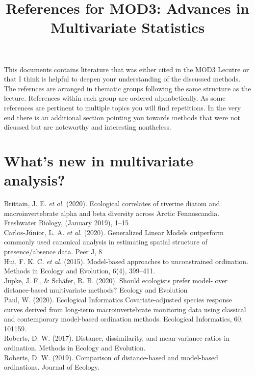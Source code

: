 \documentclass{article}
\title{References for MOD3: Advances in Multivariate Statistics}
\begin{document}
\maketitle

This documents contains literature that was either cited in the MOD3 Lecutre or that I think is helpful to deepen your understanding of the discussed methods. The refernces are arranged in thematic groups following the same structure as the lecture. References within each group are ordered alphabetically. As some references are pertinent to multiple topics you will find repetitions. In the very end there is an additional section pointing you towards methods that were not dicussed but are noteworthy and interesting nontheless.   

\section{What’s new in multivariate analysis?}

Brittain, J. E. \textit{et al.} (2020). Ecological correlates of riverine diatom and macroinvertebrate alpha and beta diversity across Arctic Fennoscandia. Freshwater Biology, (January 2019), 1–15\\

Carlos-Júnior, L. A. \textit{et al.} (2020). Generalized Linear Models outperform commonly used canonical analysis in estimating spatial structure of presence/absence data. Peer J, 8 \\

Hui, F. K. C. \textit{et al.} (2015). Model-based approaches to unconstrained ordination. Methods in Ecology and Evolution, 6(4), 399–411. \\

Jupke, J. F., \& Schäfer, R. B. (2020). Should ecologists prefer model‐ over distance‐based multivariate methods? Ecology and Evolution\\

Paul, W. (2020). Ecological Informatics Covariate-adjusted species response curves derived from long-term macroinvertebrate monitoring data using classical and contemporary model-based ordination methods. Ecological Informatics, 60, 101159.\\

Roberts, D. W. (2017). Distance, dissimilarity, and mean-variance ratios in ordination. Methods in Ecology and Evolution. \\

Roberts, D. W. (2019). Comparison of distance-based and model-based ordinations. Journal of Ecology. \\
\end{document}
